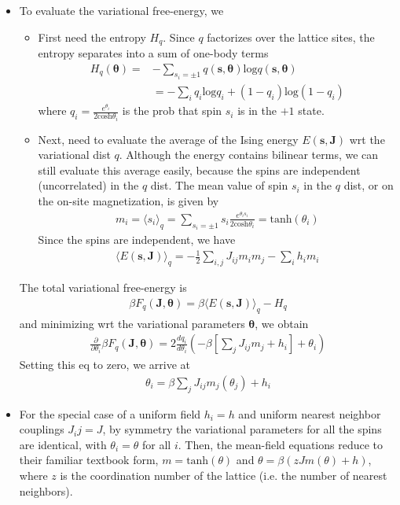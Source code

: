 \documentclass[norsk,a4paper,11pt]{article}
\begin{document}
\begin{itemize}
	\item To evaluate the variational free-energy, we 
	\begin{itemize}
		\item First need the entropy $H_q$. Since $q$ factorizes over the lattice sites, the entropy separates into a sum of one-body terms
		\begin{align}
			H_q (\bm{\theta}) =& - \sum_{s_i = \pm 1} q(\bm{s}, \bm{\theta}) \text{log} q(\bm{s}, \bm{\theta}) \\
			&= - \sum_i q_i \text{log} q_i + (1-q_i)\text{log} (1-q_i)
		\end{align}
		where $q_i = \frac{e^{\theta_i}}{2\text{cosh}\theta_i}$ is the prob that spin $s_i$ is in the $+1$ state.
		\item Next, need to evaluate the average of the Ising energy $E(\bm{s}, \bm{J})$ wrt the variational dist $q$. Although the energy contains bilinear terms, we can still evaluate this average easily, because the spins are independent (uncorrelated) in the $q$ dist. The mean value of spin $s_i$ in the $q$ dist, or on the on-site magnetization, is given by
		\begin{align}
			m_i = \langle s_i \rangle_q = \sum_{s_i = \pm 1} s_i \frac{e^{\theta_i s_i}}{2\text{cosh} \theta_i} = \text{tanh}(\theta_i)
		\end{align} 
		Since the spins are independent, we have
		\begin{align}
			\langle E(\bm{s}, \bm{J}) \rangle_q = - \frac{1}{2} \sum_{i,j} J_{ij}m_i m_j - \sum_i h_i m_i
		\end{align}
	\end{itemize}
	The total variational free-energy is
	\begin{align}
		\beta F_q (\bm{J}, \bm{\theta}) = \beta \langle E(\bm{s}, \bm{J}) \rangle_q - H_q
	\end{align}
	and minimizing wrt the variational parameters $\bm{\theta}$, we obtain
	\begin{align}
		\frac{\partial}{\partial \theta_i} \beta F_q (\bm{J}, \bm{\theta}) = 2\frac{d q_i}{d \theta_i} (-\beta [\sum_j J_{ij} m_j + h_i] + \theta_i)
	\end{align}
	Setting this eq to zero, we arrive at
	\begin{align}
		\theta_i = \beta \sum_j J_{ij} m_j (\theta_j) + h_i
	\end{align}
	\item For the special case of a uniform field $h_i = h$ and uniform nearest neighbor couplings $J_ij = J$, by symmetry the variational parameters for all the spins are identical, with $\theta_i = \theta$ for all $i$. Then, the mean-field equations reduce to their familiar textbook form, $m=\text{tanh}(\theta)$ and $\theta = \beta (z J m(\theta) + h)$, where $z$ is the coordination number of the lattice (i.e. the number of nearest neighbors).

\end{itemize}
\end{document}
